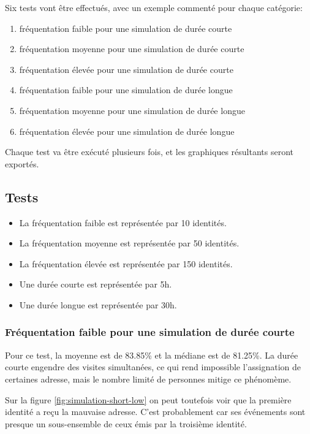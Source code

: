 Six tests vont être effectués, avec un exemple commenté pour chaque catégorie: 
\begin{enumerate}
    \item fréquentation faible pour une simulation de durée courte
    \item fréquentation moyenne pour une simulation de durée courte
    \item fréquentation élevée pour une simulation de durée courte
    \item fréquentation faible pour une simulation de durée longue
    \item fréquentation moyenne pour une simulation de durée longue
    \item fréquentation élevée pour une simulation de durée longue
\end{enumerate}

Chaque test va être exécuté plusieurs fois, et les graphiques résultants seront exportés. 
\subsection{Tests}
\begin{itemize}
    \item La fréquentation faible est représentée par 10 identités.
    \item La fréquentation moyenne est représentée par 50 identités.
    \item La fréquentation élevée est représentée par 150 identités.
\end{itemize}
\begin{itemize}
    \item Une durée courte est représentée par 5h.
    \item Une durée longue est représentée par 30h.
\end{itemize}


\subsubsection{Fréquentation faible pour une simulation de durée courte}
Pour ce test, la moyenne est de 83.85\% et la médiane est de 81.25\%.
La durée courte engendre des visites simultanées, ce qui rend impossible l'assignation de certaines adresse, mais
le nombre limité de personnes mitige ce phénomème. 

Sur la figure \ref{fig:simulation-short-low} on peut toutefois voir que la première identité a reçu la mauvaise adresse.
C'est probablement car ses événements sont presque un sous-ensemble de ceux émis par la troisième identité.

